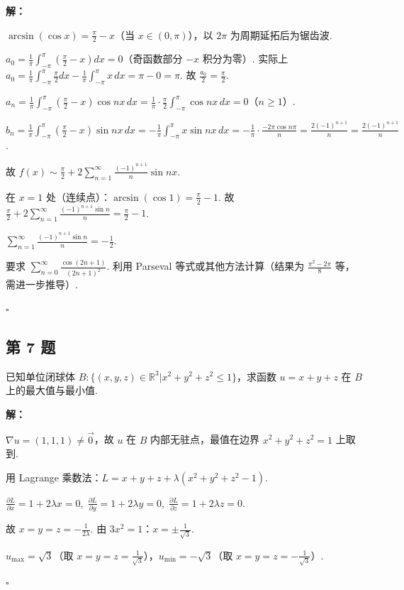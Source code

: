 \documentclass[12pt,a4paper]{article}
\newenvironment{sol}[1][解]{%
  \par\medskip\noindent\textbf{#1：}\itshape\par\noindent\ignorespaces
}{%
  \par\hfill$\square$\par\medskip
}
\begin{document}
\begin{sol}$\arcsin(\cos x)=\frac{\pi}{2}-x$（当 $x\in(0,\pi)$），以
  $2\pi$ 为周期延拓后为锯齿波.

  $a_0=\frac{1}{\pi}\int_{-\pi}^{\pi}(\frac{\pi}{2}-x)dx=0$（奇函数部分 $-x$
  积分为零）. 实际上
  $a_0=\frac{1}{\pi}\int_{-\pi}^{\pi}\frac{\pi}{2}dx-\frac{1}{\pi}\int_{-\pi}^{\pi}x\,dx=\pi-0=\pi$.
  故 $\frac{a_0}{2}=\frac{\pi}{2}$.

  $a_n=\frac{1}{\pi}\int_{-\pi}^{\pi}(\frac{\pi}{2}-x)\cos
  nx\,dx=\frac{1}{\pi}\cdot\frac{\pi}{2}\int_{-\pi}^{\pi}\cos
  nx\,dx=0$（$n\ge 1$）.

  $b_n=\frac{1}{\pi}\int_{-\pi}^{\pi}(\frac{\pi}{2}-x)\sin
  nx\,dx=-\frac{1}{\pi}\int_{-\pi}^{\pi}x\sin
  nx\,dx=-\frac{1}{\pi}\cdot\frac{-2\pi\cos
  n\pi}{n}=\frac{2(-1)^{n+1}}{n}=\frac{2(-1)^{n+1}}{n}$.

  故 $f(x)\sim\frac{\pi}{2}+2\sum_{n=1}^{\infty}\frac{(-1)^{n+1}}{n}\sin nx$.

  在 $x=1$ 处（连续点）：$\arcsin(\cos 1)=\frac{\pi}{2}-1$. 故
  $\frac{\pi}{2}+2\sum_{n=1}^{\infty}\frac{(-1)^{n+1}\sin
  n}{n}=\frac{\pi}{2}-1$.

  $\sum_{n=1}^{\infty}\frac{(-1)^{n+1}\sin n}{n}=-\frac{1}{2}$.

  要求 $\sum_{n=0}^{\infty}\frac{\cos(2n+1)}{(2n+1)^2}$. 利用 Parseval
  等式或其他方法计算（结果为 $\frac{\pi^2-2\pi}{8}$ 等，需进一步推导）.

\end{sol}
\subsection*{第 7 题}
已知单位闭球体 $B: \{(x,y,z)\in\mathbb{R}^3|x^2+y^2+z^2\le1\}$，求函数 $u=x+y+z$
在 $B$ 上的最大值与最小值.

\begin{sol}$\nabla u=(1,1,1)\ne\vec{0}$，故 $u$ 在 $B$ 内部无驻点，最值在边界
  $x^2+y^2+z^2=1$ 上取到.

  用 Lagrange 乘数法：$L=x+y+z+\lambda(x^2+y^2+z^2-1)$.

  $\frac{\partial L}{\partial x}=1+2\lambda x=0,\;\frac{\partial
  L}{\partial y}=1+2\lambda y=0,\;\frac{\partial L}{\partial z}=1+2\lambda z=0.$

  故 $x=y=z=-\frac{1}{2\lambda}$. 由 $3x^2=1$：$x=\pm\frac{1}{\sqrt{3}}$.

  $u_{\max}=\sqrt{3}$（取
  $x=y=z=\frac{1}{\sqrt{3}}$），$u_{\min}=-\sqrt{3}$（取
  $x=y=z=-\frac{1}{\sqrt{3}}$）.

\end{sol}
\end{document}
